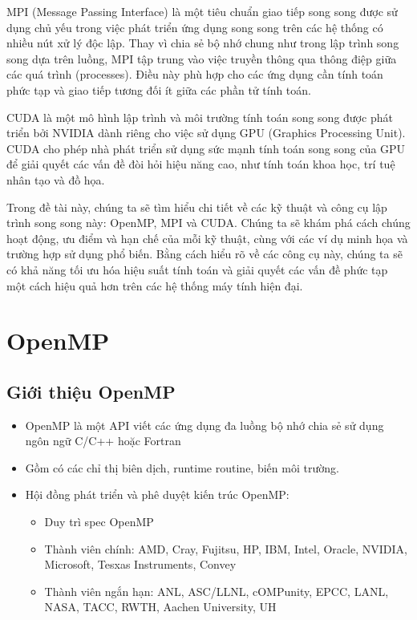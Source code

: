 \documentclass[14pt, a4paper]{article}
\numberwithin{equation}{section}
\numberwithin{figure}{section}
\numberwithin{dl}{section}
\numberwithin{md}{section}
\numberwithin{bd}{section}
\numberwithin{dn}{section}
\numberwithin{hq}{section}
\begin{document}
MPI (Message Passing Interface) là một tiêu chuẩn giao tiếp song song được sử dụng chủ yếu trong việc phát triển ứng dụng song song trên các hệ thống có nhiều nút xử lý độc lập. Thay vì chia sẻ bộ nhớ chung như trong lập trình song song dựa trên luồng, MPI tập trung vào việc truyền thông qua thông điệp giữa các quá trình (processes). Điều này phù hợp cho các ứng dụng cần tính toán phức tạp và giao tiếp tương đối ít giữa các phần tử tính toán.

CUDA là một mô hình lập trình và môi trường tính toán song song được phát triển bởi NVIDIA dành riêng cho việc sử dụng GPU (Graphics Processing Unit). CUDA cho phép nhà phát triển sử dụng sức mạnh tính toán song song của GPU để giải quyết các vấn đề đòi hỏi hiệu năng cao, như tính toán khoa học, trí tuệ nhân tạo và đồ họa.

Trong đề tài này, chúng ta sẽ tìm hiểu chi tiết về các kỹ thuật và công cụ lập trình song song này: OpenMP, MPI và CUDA. Chúng ta sẽ khám phá cách chúng hoạt động, ưu điểm và hạn chế của mỗi kỹ thuật, cùng với các ví dụ minh họa và trường hợp sử dụng phổ biến. Bằng cách hiểu rõ về các công cụ này, chúng ta sẽ có khả năng tối ưu hóa hiệu suất tính toán và giải quyết các vấn đề phức tạp một cách hiệu quả hơn trên các hệ thống máy tính hiện đại.
    
\newpage

\section{OpenMP}

\subsection{Giới thiệu OpenMP}

\begin{itemize}
    \item OpenMP là một API viết các ứng dụng đa luồng bộ nhớ chia sẻ sử dụng ngôn ngữ C/C++ hoặc Fortran
    \item Gồm có các chỉ thị biên dịch, runtime routine, biến môi trường.
    \item Hội đồng phát triển và phê duyệt kiến trúc OpenMP:
    \begin{itemize}
        \item Duy trì spec OpenMP
        \item Thành viên chính: AMD, Cray, Fujitsu, HP, IBM, Intel, Oracle, NVIDIA, Microsoft, Tesxas Instruments, Convey
        \item Thành viên ngắn hạn: ANL,	ASC/LLNL, cOMPunity, EPCC, LANL, NASA, TACC, RWTH, Aachen University, UH
    \end{itemize}
\end{itemize}
\end{document}
